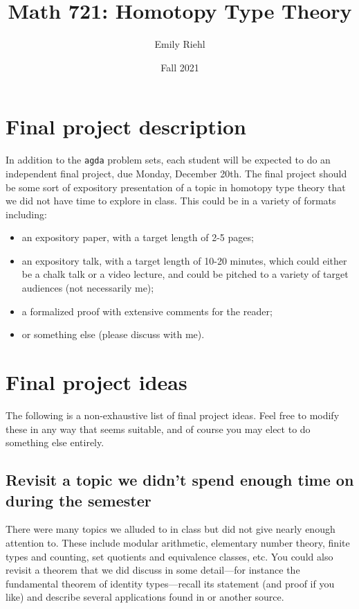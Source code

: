 \documentclass{amsart}
\title{Math 721: Homotopy Type Theory}
\author{Emily Riehl}
\theoremstyle{definition}
\theoremstyle{remark}
\numberwithin{equation}{section}
\begin{document}
\date{Fall 2021}


\address{Dept.~of Mathematics\\Johns Hopkins Univ.\\ 3400 N.~Charles Street \\ Baltimore, MD 21218}


\maketitle


\section*{Final project description}

In addition to the \texttt{agda} problem sets, each student will be expected to do an independent final project, due Monday, December 20th. The final project should be some sort of expository presentation of a topic in homotopy type theory that we did not have time to explore in class. This could be in a variety of formats including:
\begin{itemize}
\item an expository paper, with a target length of 2-5 pages;
\item an expository talk, with a target length of 10-20 minutes, which could either be a chalk talk or a video lecture, and could be pitched to a variety of target audiences (not necessarily me);
\item a formalized proof with extensive comments for the reader;
\item or something else (please discuss with me).
\end{itemize}

\section*{Final project ideas}

The following is a non-exhaustive list of final project ideas. Feel free to modify these in any way that seems suitable, and of course you may elect to do something else entirely.

\subsection*{Revisit a topic we didn't spend enough time on during the semester} There were many topics we alluded to in class but did not give nearly enough attention to. These include modular arithmetic, elementary number theory, finite types and counting,  set quotients and equivalence classes, etc. You could also revisit a theorem that we did discuss in some detail---for instance the fundamental theorem of identity types---recall its statement (and proof if you like) and describe several applications found in \cite{Rijke} or another source.
\end{document}
